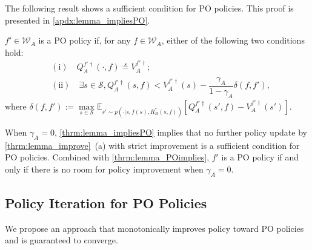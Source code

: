 \documentclass{acml}
\providecommand{\E}{\mathbb{E}} %
\providecommand{\where}{\mathrm{where~}}
\providecommand{\eqs}{\stackrel{s}{=}}
\begin{document}
The following result shows a sufficient condition for PO policies.
This proof is presented in \cref{apdx:lemma_impliesPO}.

\begin{theorem}\label{thrm:lemma_impliesPO}
	$f'\in \mathcal{W}_A$ is a PO policy if, for any $f\in \mathcal{W}_A$, either of the following two conditions hold:
        \begin{align*}
            &(\mathrm{i})\quad Q_A^{f'\dag}(\cdot,f) \eqs V_A^{f'\dag};\\
            &(\mathrm{ii})\quad \exists s \in \mathcal{S}, Q_A^{f'\dag}(s,f)<V_A^{f'\dag}(s)-\dfrac{\gamma_A}{1-\gamma_A}\delta(f,f'),
        \end{align*}
        where $\delta(f,f'):=\max\limits_{s\in\mathcal{S}}\E_{s' \sim p(\cdot|s,f(s),R_B^*(s,f))}\left[ Q_A^{f'\dag}(s',f)-V_A^{f'\dag}(s') \right].$
\end{theorem}
When $\gamma_A=0$, \cref{thrm:lemma_impliesPO} implies that no further policy update by \cref{thrm:lemma_improve}~(a) with strict improvement is a sufficient condition for PO policies.
Combined with \cref{thrm:lemma_POimplies}, $f'$ is a PO policy if and only if there is no room for policy improvement when $\gamma_A=0$.


\subsection{Policy Iteration for PO Policies}\label{sec:approach}

We propose an approach that monotonically improves policy toward PO policies and is guaranteed to converge. 
\end{document}
